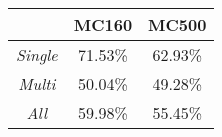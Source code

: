 \begin{tabular}{c|c|c|}
\cline{2-3}
\textbf{}                             & \textbf{MC160} & \textbf{MC500} \\ \hline
\multicolumn{1}{|c|}{\textit{Single}} & 71.53\%        & 62.93\%        \\ \hline
\multicolumn{1}{|c|}{\textit{Multi}}  & 50.04\%        & 49.28\%        \\ \hline
\multicolumn{1}{|c|}{\textit{All}}    & 59.98\%        & 55.45\%        \\ \hline
\end{tabular}